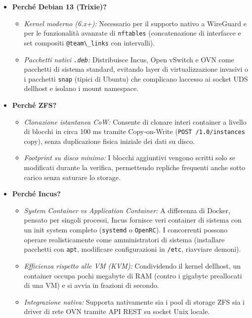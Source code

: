 \begin{itemize}
\item
  \textbf{Perché Debian 13 (Trixie)?}

  \begin{itemize}
  \tightlist
  \item
    \emph{Kernel moderno (6.x+):} Necessario per il supporto nativo a
    WireGuard e per le funzionalità avanzate di
    \passthrough{\lstinline!nftables!} (concatenazione di interfacce e
    set compositi \passthrough{\lstinline!@team\_links!} con
    intervalli).
  \item
    \emph{Pacchetti nativi \passthrough{\lstinline!.deb!}:} Distribuisce
    Incus, Open vSwitch e OVN come pacchetti di sistema standard,
    evitando layer di virtualizzazione invasivi o i pacchetti
    \passthrough{\lstinline!snap!} (tipici di Ubuntu) che complicano
    l\textquotesingle accesso ai socket UDS dell\textquotesingle host e
    isolano i mount namespace.
  \end{itemize}
\item
  \textbf{Perché ZFS?}

  \begin{itemize}
  \tightlist
  \item
    \emph{Clonazione istantanea CoW:} Consente di clonare interi
    container a livello di blocchi in circa 100 ms tramite Copy-on-Write
    (\passthrough{\lstinline!POST /1.0/instances!} copy), senza
    duplicazione fisica iniziale dei dati su disco.
  \item
    \emph{Footprint su disco minimo:} I blocchi aggiuntivi vengono
    scritti solo se modificati durante la verifica, permettendo repliche
    frequenti anche sotto carico senza saturare lo storage.
  \end{itemize}
\item
  \textbf{Perché Incus?}

  \begin{itemize}
  \tightlist
  \item
    \emph{System Container vs Application Container:} A differenza di
    Docker, pensato per singoli processi, Incus fornisce veri container
    di sistema con un init system completo
    (\passthrough{\lstinline!systemd!} o
    \passthrough{\lstinline!OpenRC!}). I concorrenti possono operare
    realisticamente come amministratori di sistema (installare pacchetti
    con \passthrough{\lstinline!apt!}, modificare configurazioni in
    \passthrough{\lstinline!/etc!}, riavviare demoni).
  \item
    \emph{Efficienza rispetto alle VM (KVM):} Condividendo il kernel
    dell\textquotesingle host, un container occupa pochi megabyte di RAM
    (contro i gigabyte preallocati di una VM) e si avvia in frazioni di
    secondo.
  \item
    \emph{Integrazione nativa:} Supporta nativamente sia i pool di
    storage ZFS sia i driver di rete OVN tramite API REST su socket Unix
    locale.
  \end{itemize}
\end{itemize}

